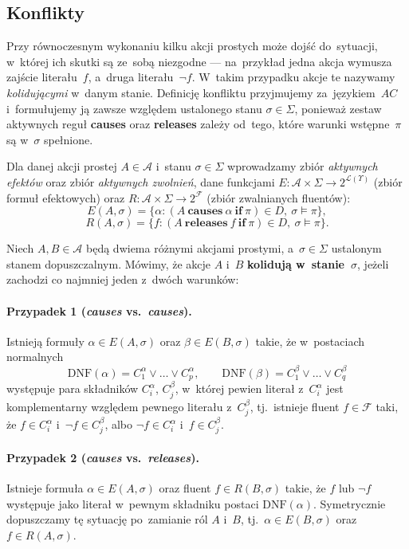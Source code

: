 \documentclass[11pt,a4paper]{article}
\newif\ifshowbib
\newcommand{\bibonly}[1]{\ifshowbib#1\fi}
\renewcommand{\cite}[2][]{\unskip}%
\newcommand{\causes}{\textbf{causes}}
\renewcommand{\iff}{\textbf{if}}
\newcommand{\releases}{\textbf{releases}}
\newcommand{\DNF}{\mathrm{DNF}}
\theoremstyle{definition}
\begin{document}
\subsection{Konflikty}
\label{sec:konflikty}

Przy równoczesnym wykonaniu kilku akcji prostych może dojść do~sytuacji,
w~której ich skutki są ze~sobą niezgodne --- na~przykład jedna akcja
wymusza zajście literału~$f$, a~druga literału~$\neg f$. W~takim
przypadku akcje te nazywamy \emph{kolidującymi} w~danym stanie.
Definicję konfliktu przyjmujemy za~językiem~$AC$\bibonly{~\cite{rw05}}
i~formułujemy ją zawsze względem ustalonego stanu $\sigma \in \Sigma$,
ponieważ zestaw aktywnych reguł \causes{} oraz \releases{} zależy od~tego,
które warunki wstępne~$\pi$ są w~$\sigma$ spełnione.

Dla danej akcji prostej $A \in \mathcal{A}$ i~stanu $\sigma \in \Sigma$
wprowadzamy zbiór \emph{aktywnych efektów} oraz zbiór \emph{aktywnych zwolnień}, dane funkcjami
$E : \mathcal{A} \times \Sigma \to 2^{\mathcal{L}(\Upsilon)}$ (zbiór formuł efektowych) oraz
$R : \mathcal{A} \times \Sigma \to 2^{\mathcal{F}}$ (zbiór zwalnianych fluentów):
\[
  E(A,\sigma)=\{\alpha : (A\ \causes\ \alpha\ \iff\ \pi)\in D,\ \sigma \models \pi\},
\]
\[
  R(A,\sigma)=\{f : (A\ \releases\ f\ \iff\ \pi)\in D,\ \sigma \models \pi\}.
\]

\noindent Niech $A, B \in \mathcal{A}$ będą dwiema różnymi akcjami prostymi, a~$\sigma \in \Sigma$
ustalonym stanem dopuszczalnym. Mówimy, że akcje $A$ i~$B$
\textbf{kolidują w~stanie~$\sigma$}, jeżeli zachodzi co najmniej jeden
z~dwóch warunków:

\paragraph{Przypadek 1 (\textit{causes} vs.\ \textit{causes}).}
Istnieją formuły $\alpha \in E(A,\sigma)$ oraz $\beta \in E(B,\sigma)$
takie, że w~postaciach normalnych
\[
  \DNF(\alpha) = C_1^\alpha \lor \ldots \lor C_{p}^\alpha,
  \qquad
  \DNF(\beta) = C_1^\beta \lor \ldots \lor C_{q}^\beta
\]
występuje para składników $C_i^\alpha$, $C_j^\beta$, w~której pewien
literał z~$C_i^\alpha$ jest komplementarny względem pewnego literału
z~$C_j^\beta$, tj.\ istnieje fluent $f \in \mathcal{F}$ taki, że
$f \in C_i^\alpha$ i~$\neg f \in C_j^\beta$, albo $\neg f \in C_i^\alpha$
i~$f \in C_j^\beta$.

\paragraph{Przypadek 2 (\textit{causes} vs.\ \textit{releases}).}
Istnieje formuła $\alpha \in E(A,\sigma)$ oraz fluent $f \in R(B,\sigma)$
takie, że $f$ lub $\neg f$ występuje jako literał w~pewnym składniku
postaci $\DNF(\alpha)$. Symetrycznie dopuszczamy tę sytuację po~zamianie
ról $A$ i~$B$, tj.\ $\alpha \in E(B,\sigma)$ oraz $f \in R(A,\sigma)$.
\end{document}

